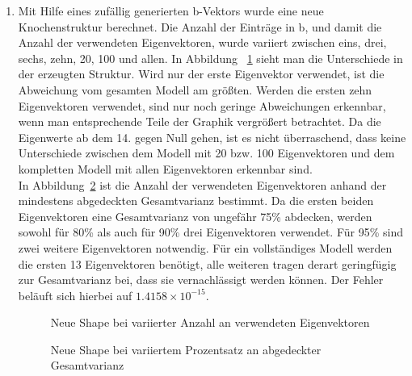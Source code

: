 \documentclass[]{report}
\newlength\figureheight
\newlength\figurewidth
\begin{document}
\begin{enumerate}
\begin{enumerate}
		\item
		Mit Hilfe eines zufällig generierten b-Vektors wurde eine neue Knochenstruktur berechnet. Die Anzahl der Einträge in b, und damit die Anzahl der verwendeten Eigenvektoren, wurde variiert zwischen eins, drei, sechs, zehn, 20, 100 und allen. In Abbildung ~\ref{fig:shapesK} sieht man die Unterschiede in der erzeugten Struktur. Wird nur der erste Eigenvektor verwendet, ist die Abweichung vom gesamten Modell am größten. Werden die ersten zehn Eigenvektoren verwendet, sind nur noch geringe Abweichungen erkennbar, wenn man entsprechende Teile der Graphik vergrößert betrachtet. Da die Eigenwerte ab dem 14. gegen Null gehen, ist es nicht überraschend, dass keine Unterschiede zwischen dem Modell mit 20 bzw. 100 Eigenvektoren und dem kompletten Modell mit allen Eigenvektoren erkennbar sind.\\
		In Abbildung~\ref{fig:shapesVar} ist die Anzahl der verwendeten Eigenvektoren anhand der mindestens abgedeckten Gesamtvarianz bestimmt. Da die ersten beiden Eigenvektoren eine Gesamtvarianz von  ungefähr 75\% abdecken, werden sowohl für 80\% als auch für 90\% drei Eigenvektoren verwendet. Für 95\% sind zwei weitere Eigenvektoren notwendig. Für ein vollständiges Modell werden die ersten 13 Eigenvektoren benötigt, alle weiteren tragen derart geringfügig zur Gesamtvarianz bei, dass sie vernachlässigt werden können. Der Fehler beläuft sich hierbei auf $1.4158\times 10^{-15}$.
		\setlength\figureheight{5cm}
		\setlength{}
		\begin{figure}
			\centering
			
			\caption{Neue Shape bei variierter Anzahl an verwendeten Eigenvektoren}
			\label{fig:shapesK}
		\end{figure}
		\qquad
		\begin{figure}
			\centering
			
			\caption{Neue Shape bei variiertem Prozentsatz an abgedeckter Gesamtvarianz}
			\label{fig:shapesVar}
		\end{figure}
	\end{enumerate}
\end{enumerate}
\end{document}

